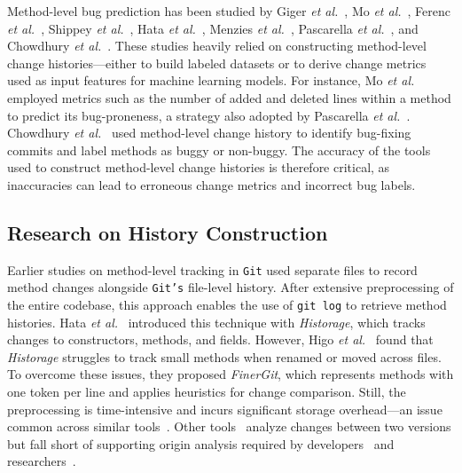 Method-level bug prediction has been studied by Giger \textit{et al.}~\cite{giger_method-level_2012}, Mo \textit{et al.}~\cite{mo_exploratory_2022}, Ferenc \textit{et al.}~\cite{ferenc_automatically_2020}, Shippey \textit{et al.}~\cite{shippey_so_2016}, Hata \textit{et al.}~\cite{hata_bug_2012}, Menzies \textit{et al.}~\cite{menzies_data_2007}, Pascarella \textit{et al.}~\cite{pascarella_performance_2020}, and Chowdhury \textit{et al.}~\cite{chowdhury_method-level_2024}. These studies heavily relied on constructing method-level change histories—either to build labeled datasets or to derive change metrics used as input features for machine learning models. For instance, Mo \textit{et al.}~\cite{mo_exploratory_2022} employed metrics such as the number of added and deleted lines within a method to predict its bug-proneness, a strategy also adopted by Pascarella \textit{et al.}~\cite{pascarella_performance_2020}. Chowdhury \textit{et al.}~\cite{chowdhury_method-level_2024} used method-level change history to identify bug-fixing commits and label methods as buggy or non-buggy. The accuracy of the tools used to construct method-level change histories is therefore critical, as inaccuracies can lead to erroneous change metrics and incorrect bug labels.

\subsection{Research on History Construction}
Earlier studies on method-level tracking in \texttt{Git} used separate files to record method changes alongside \texttt{Git’s} file-level history. After extensive preprocessing of the entire codebase, this approach enables the use of \texttt{git log} to retrieve method histories. Hata \textit{et al.}~\cite{hata_historage_2011} introduced this technique with \textit{Historage}, which tracks changes to constructors, methods, and fields. However, Higo \textit{et al.}~\cite{higo_tracking_2020} found that \textit{Historage} struggles to track small methods when renamed or moved across files. To overcome these issues, they proposed \textit{FinerGit}, which represents methods with one token per line and applies heuristics for change comparison. Still, the preprocessing is time-intensive and incurs significant storage overhead—an issue common across similar tools~\cite{kim_when_2005,tu_integrated_2002,zimmermann_fine-grained_2006,hassan2004c}. Other tools~\cite{huang_cldiff_2018,falleri_fine-grained_2024} analyze changes between two versions but fall short of supporting origin analysis required by developers~\cite{grund_codeshovel_2021} and researchers~\cite{chowdhury_good_2025}.

